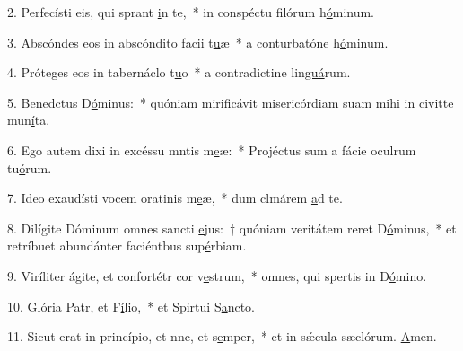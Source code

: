 2. Perfecísti eis, qui sprant \uline{i}n te,~* in conspéctu filórum h\uline{ó}minum.\par 
3. Abscóndes eos in abscóndito facii t\uline{u}æ~* a conturbatóne h\uline{ó}minum.\par 
4. Próteges eos in tabernáclo t\uline{u}o~* a contradictine lin\uline{guá}rum.\par 
5. Benedctus D\uline{ó}minus:~* quóniam mirificávit misericórdiam suam mihi in civitte mun\uline{í}ta.\par 
6. Ego autem dixi in excéssu mntis m\uline{e}æ:~* Projéctus sum a fácie oculrum tu\uline{ó}rum.\par 
7. Ideo exaudísti vocem oratinis m\uline{e}æ,~* dum clmárem \uline{a}d te.\par 
8. Dilígite Dóminum omnes sancti \uline{e}jus:~† quóniam veritátem reret D\uline{ó}minus,~* et retríbuet abundánter faciéntbus sup\uline{é}rbiam.\par 
9. Viríliter ágite, et confortétr cor v\uline{e}strum,~* omnes, qui spertis in D\uline{ó}mino.\par 
10. Glória Patr, et F\uline{í}lio,~* et Spirtui S\uline{a}ncto.\par 
11. Sicut erat in princípio, et nnc, et s\uline{e}mper,~* et in sǽcula sæclórum. \uline{A}men.\par 
